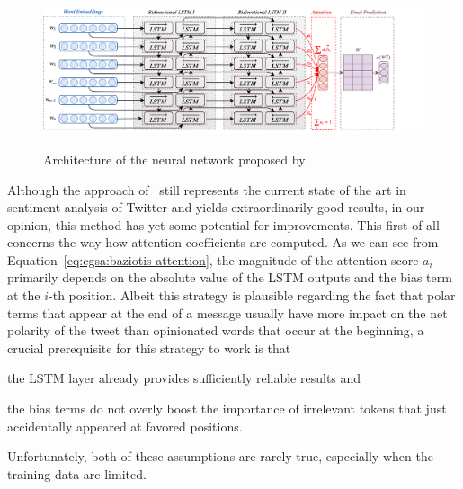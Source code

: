 \begin{figure}[htbp!]
{
  \centering
  \includegraphics[width=\linewidth]{img/baziotis.png}
}
\caption[Neural network of \citet{Baziotis:17}]{Architecture of the
  neural network proposed
  by~\citet{Baziotis:17}}\label{cgsa:fig:baziotis}
\end{figure}

Although the approach of~\citet{Baziotis:17} still represents the
current state of the art in sentiment analysis of Twitter and yields
extraordinarily good results, in our opinion, this method has yet some
potential for improvements.  This first of all concerns the way how
attention coefficients are computed.  As we can see from
Equation~\ref{eq:cgsa:baziotis-attention}, the magnitude of the
attention score $a_i$ primarily depends on the absolute value of the
LSTM outputs and the bias term at the $i$-th position.  Albeit this
strategy is plausible regarding the fact that polar terms that appear
at the end of a message usually have more impact on the net polarity
of the tweet than opinionated words that occur at the beginning, a
crucial prerequisite for this strategy to work is that
\begin{inparaenum}[(i)]
\item the LSTM layer already provides sufficiently reliable results
  and
\item the bias terms do not overly boost the importance of irrelevant
  tokens that just accidentally appeared at favored positions.
\end{inparaenum}
Unfortunately, both of these assumptions are rarely true, especially
when the training data are limited.

